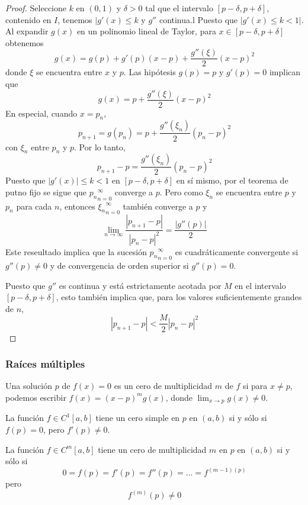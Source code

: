 \begin{proof}
    Seleccione $k$ en $(0,1)$ y $\delta > 0$ tal que el intervalo $[p - \delta, p + \delta]$, contenido en $I$, tenemos $|g'(x) \leq k$ y $g''$ continua.l Puesto que $|g'(x) \leq k < 1|$. Al expandir $g(x)$ en un polinomio lineal de Taylor, para $x \in [p - \delta, p + \delta]$ obtenemos
    \[ g(x) = g(p) + g'(p) (x - p) + \frac{g''(\xi)}{2} (x - p)^2 \]
    donde $\xi$ se encuentra entre $x$ y $p$. Las hipótesis $g(p) = p$ y $g'(p) = 0$ implican que 
    \[ g(x) = p + \frac{g''(\xi)}{2} (x - p)^2 \]
    En especial, cuando $x = p_n$,
    \[ p_{n + 1} = g(p_n) = p + \frac{g''(\xi_n)}{2} (p_n - p)^2 \]
    con $\xi_n$ entre $p_n$ y $p$. Por lo tanto,
    \[ p_{n + 1} - p = \frac{g''(\xi_n)}{2} (p_n - p)^2 \]
    Puesto que $|g'(x)| \leq k < 1$ en $[p - \delta, p + \delta]$ en sí mismo, por el teorema de putno fijo se sigue que ${p_n}_{n = 0}^\infty$ converge a $p$. Pero como $\xi_n$ se encuentra entre $p$ y $p_n$ para cada $n$, entonces ${\xi_n}_{n = 0}^\infty$ también converge a $p$ y
    \[ \lim_{n \rightarrow \infty} \frac{|p_{n + 1} - p|}{|p_n - p|^2} = \frac{|g''(p)|}{2} \]
    Este reseultado implica que la sucesión ${p_n}_{n = 0}^\infty$ es cuadráticamente convergente si $g''(p) \neq 0$ y de convergencia de orden superior si $g''(p) = 0$.

    Puesto que $g''$ es continua y está estrictamente acotada por $M$ en el intervalo $[p - \delta, p + \delta]$, esto también implica que, para los valores suficientemente grandes de $n$,
    \[ |p_{n + 1} - p| < \frac{M}{2} |p_n - p|^2 \]
\end{proof}

\subsubsection{Raíces múltiples}
\begin{definition}
    Una solución $p$ de $f(x) = 0$ es un cero de multiplicidad $m$ de $f$ si para $x \neq p$, podemos escribir $f(x) = (x - p)^m g(x)$, donde $\lim_{x \rightarrow p} g(x) \neq 0$.
\end{definition}

\begin{theorem}
    La función $f \in C^1[a, b]$ tiene un cero simple en $p$ en $(a, b)$ si y sólo si $f(p)= 0$, pero $f'(p) \neq 0$.
\end{theorem}

\begin{theorem}
    La función $f \in C^m[a, b]$ tiene un cero de multiplicidad $m$ en $p$ en $(a, b)$ si y sólo si
    \[ 0 = f(p) = f'(p) = f''(p) = ... = f^{(m - 1)(p)} \] 
    pero
    \[ f^{(m)}(p) \neq 0 \]
\end{theorem}

